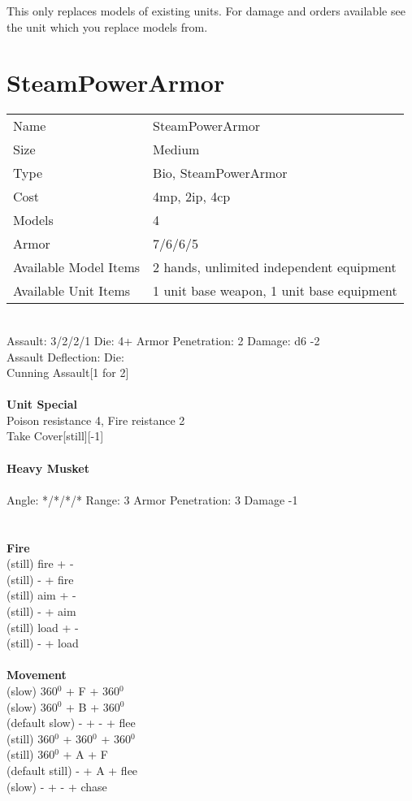 This only replaces models of existing units. For damage and orders available see the unit which you replace models from.



\pagebreak

\section{ SteamPowerArmor }

\begin{tabular}{ll}
  Name & SteamPowerArmor \\
  Size & Medium\\
  Type & Bio, SteamPowerArmor\\
  Cost & 4mp, 2ip, 4cp\\
  Models & 4\\
  Armor & 7/6/6/5\\
  Available Model Items & 2 hands, unlimited independent equipment \\
  Available Unit Items & 1 unit base weapon, 1 unit base equipment \\
\end{tabular}

\ \\
Assault: 3/2/2/1 Die: 4+ Armor Penetration: 2 Damage: d6 -2 \\
Assault Deflection:  Die: \\
\indent Cunning Assault[1 for 2] \\
\ \\

{\bf Unit Special} \\
Poison resistance 4, Fire reistance 2\\ Take Cover[still][-1]
\ \\
\ \\
{\bf Heavy Musket } \\
\ \\
Angle: */*/*/* Range: 3 Armor Penetration: 3 Damage -1 \\
\indent  \\





\ \\ {\bf Fire } \\
(still) fire + - \\
(still) - + fire \\
(still) aim + - \\
(still) - + aim \\
(still) load + - \\
(still) - + load \\
\ \\ {\bf Movement } \\
(slow) 360$^0$ + F + 360$^0$ \\
(slow) 360$^0$ + B + 360$^0$ \\
(default slow) - + - + flee \\
(still) 360$^0$ + 360$^0$ + 360$^0$ \\
(still) 360$^0$ + A + F \\
(default still) - + A + flee \\
(slow) - + - + chase \\



